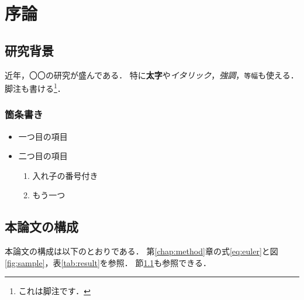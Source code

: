 \chapter{序論}\label{chap:intro}

\section{研究背景}\label{sec:background}

近年，〇〇の研究が盛んである\cite{einstein1905,knuth1984}．
特に\textbf{太字}や\textit{イタリック}，\emph{強調}，\texttt{等幅}も使える．
脚注も書ける\footnote{これは脚注です．}．

\subsection{箇条書き}

\begin{itemize}
  \item 一つ目の項目
  \item 二つ目の項目
  \begin{enumerate}
    \item 入れ子の番号付き
    \item もう一つ
  \end{enumerate}
\end{itemize}

\section{本論文の構成}

本論文の構成は以下のとおりである．
第\ref{chap:method}章の式\eqref{eq:euler}と図\ref{fig:sample}，表\ref{tab:result}を参照．
節\ref{sec:background}も参照できる．
